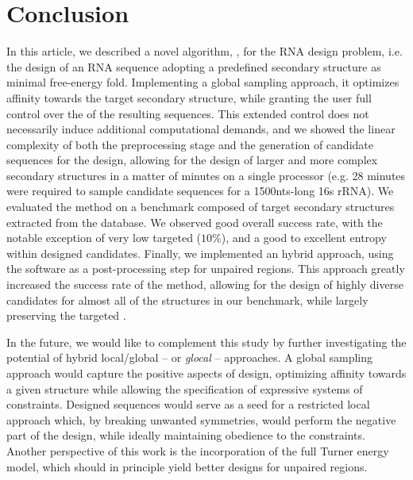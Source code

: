 \section{Conclusion}

\label{sec:conclusion}

In this article, we described a novel algorithm, \ourprog, for the RNA design problem, i.e. the design of an RNA sequence adopting a predefined secondary structure as minimal free-energy fold.
Implementing a global sampling approach, it optimizes affinity towards the target secondary structure, while granting the user full control over the \GCContent of the resulting sequences.
This extended control does not necessarily induce additional computational demands, and we showed the linear complexity of both the preprocessing stage and the generation of candidate sequences for the design, allowing for the design of larger and more complex secondary structures in a matter of minutes on a single processor (e.g. 28 minutes were required to sample candidate sequences for a 1500nts-long 16s rRNA). We evaluated the method on a benchmark composed of target secondary structures extracted from the \RNASTRAND database. We observed good overall success rate, with the notable exception of very low targeted \GCContent ($10\%$), and a good to excellent entropy within designed candidates.
Finally, we implemented an hybrid approach, using the \RNAinverse software as a post-processing step for unpaired regions. This approach greatly increased the success rate of the method, allowing for the design of highly diverse candidates for almost all of the structures in our benchmark, while largely preserving the targeted \GCContent.

In the future, we would like to complement this study by further investigating the potential of hybrid local/global -- or {\em glocal} -- approaches.
A global sampling approach would capture the positive aspects of design, optimizing affinity towards a given structure while allowing the specification of expressive systems of constraints.
Designed sequences would serve as a seed for a restricted local approach which, by breaking unwanted symmetries, would perform the negative part of the design, 
while ideally maintaining obedience to the constraints. Another perspective of this work is the incorporation of the full Turner energy model, which should in principle yield better designs for unpaired regions.